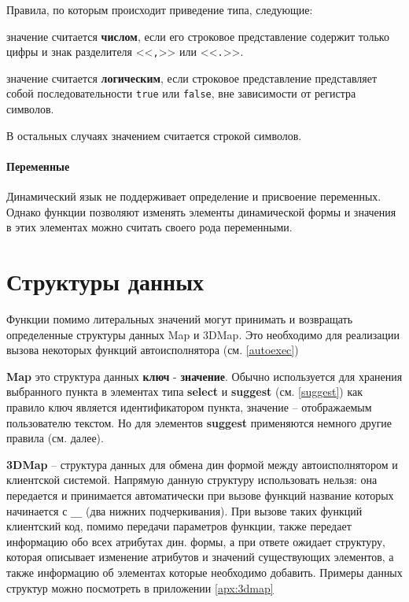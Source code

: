\documentclass[../index.tex]{subfiles}
\begin{document}

Правила, по которым происходит приведение типа, следующие:

значение считается \textbf{числом}, если его строковое представление содержит только цифры и знак разделителя <<\verb|,|>> или <<\verb|.|>>.

значение считается  \textbf{логическим}, если строковое представление представляет собой последовательности \verb|true| или
 \verb|false|, вне зависимости от регистра символов.

В остальных случаях значением считается строкой символов.


\paragraph{Переменные}
Динамический язык не поддерживает определение и присвоение переменных. Однако функции позволяют изменять элементы 
динамической формы и значения в этих элементах можно считать своего рода переменными.

\section{Структуры данных}
Функции помимо литеральных значений могут принимать и возвращать определенные структуры данных Map и 3DMap.
Это необходимо для реализации вызова некоторых функций автоисполнятора (см. \ref{autoexec})

\textbf{Map} это структура данных \textbf{ключ} - \textbf{значение}. 
Обычно используется для хранения выбранного пункта в элементах типа \textbf{select} 
и \textbf{suggest} (см. \ref{suggest})
как правило ключ является идентификатором пункта, значение -- отображаемым пользователю текстом. Но для элементов
\textbf{suggest} применяются немного другие правила (см. далее).

\textbf{3DMap} -- структура данных для обмена дин формой между автоисполнятором и клиентской системой. 
Напрямую данную структуру использовать нельзя: она передается и принимается автоматически при вызове функций
название которых начинается с \verb|__| (два нижних подчеркивания). При вызове таких функций клиентский код, помимо передачи 
параметров функции, также передает информацию обо всех атрибутах дин. формы, а при ответе ожидает структуру, которая описывает
изменение атрибутов и значений существующих элементов, а также информацию об элементах которые необходимо добавить.
Примеры данных структур можно посмотреть в приложении \ref{apx:3dmap}
\end{document}
